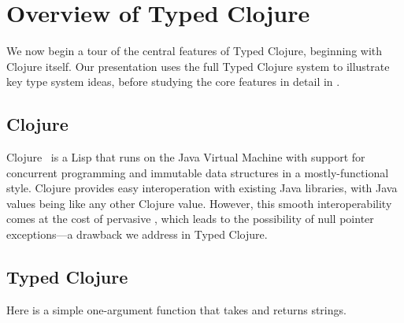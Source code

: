 \section{Overview of Typed Clojure}

\label{sec:overview}

We now begin a tour of the central features of Typed Clojure,
beginning with Clojure itself. Our presentation
uses the full Typed Clojure system to illustrate key type system
ideas, before studying the core features in detail in
. 

\subsection{Clojure}

Clojure~\cite{Hic08} is a Lisp that runs on the
Java Virtual Machine with support for concurrent programming
and immutable data structures in a mostly-functional
style.
%
Clojure provides easy interoperation with existing Java libraries, with Java values being like any other Clojure value. 
However, this smooth interoperability comes at the cost of pervasive , which leads to the possibility of null pointer exceptions---a drawback we address in Typed Clojure.

%
%
%

\subsection{Typed Clojure}

Here is a simple one-argument function
%
 that takes and returns strings.

